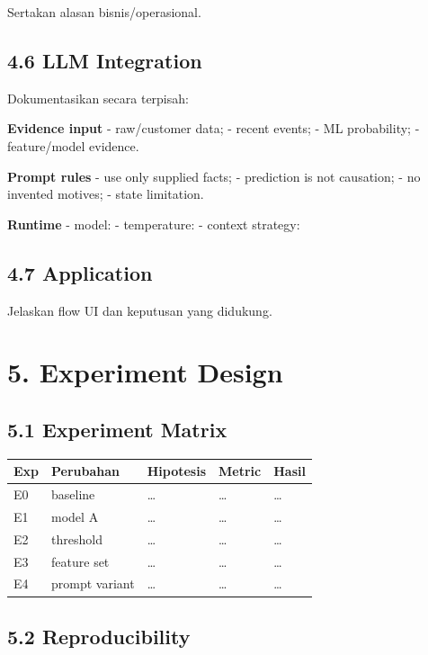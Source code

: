 \documentclass[
  indonesian,
  letterpaper,
  DIV=11,
  numbers=noendperiod]{scrreprt}
\newcounter{none} %
\begin{document}
Sertakan alasan bisnis/operasional.

\section{4.6 LLM Integration}\label{llm-integration}

Dokumentasikan secara terpisah:

\textbf{Evidence input} - raw/customer data; - recent events; - ML
probability; - feature/model evidence.

\textbf{Prompt rules} - use only supplied facts; - prediction is not
causation; - no invented motives; - state limitation.

\textbf{Runtime} - model: - temperature: - context strategy:

\section{4.7 Application}\label{application}

Jelaskan flow UI dan keputusan yang didukung.

\chapter{5. Experiment Design}\label{experiment-design}

\section{5.1 Experiment Matrix}\label{experiment-matrix}

{\def\LTcaptype{none} %
\begin{longtable}[]{@{}lllll@{}}
\toprule\noalign{}
Exp & Perubahan & Hipotesis & Metric & Hasil \\
\midrule\noalign{}
\endhead
\bottomrule\noalign{}
\endlastfoot
E0 & baseline & \ldots{} & \ldots{} & \ldots{} \\
E1 & model A & \ldots{} & \ldots{} & \ldots{} \\
E2 & threshold & \ldots{} & \ldots{} & \ldots{} \\
E3 & feature set & \ldots{} & \ldots{} & \ldots{} \\
E4 & prompt variant & \ldots{} & \ldots{} & \ldots{} \\
\end{longtable}
}

\section{5.2 Reproducibility}\label{reproducibility}
\end{document}
